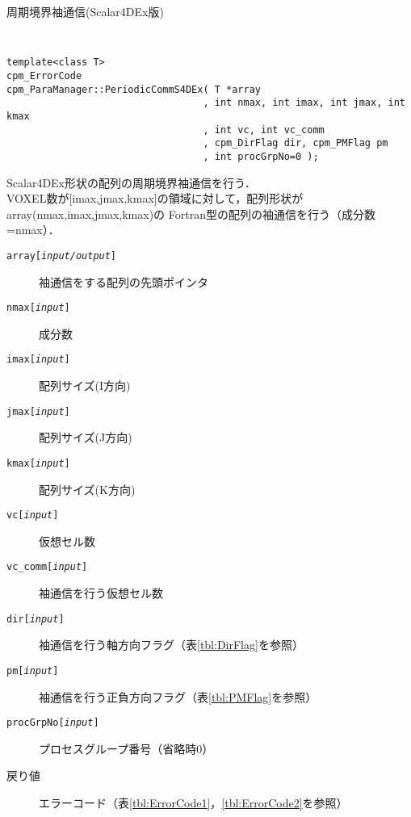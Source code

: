 \begin{spacing}{0.8}
\begin{itembox}[l]{周期境界袖通信(Scalar4DEx版)}
{\tt
\begin{verbatim}
template<class T>
cpm_ErrorCode
cpm_ParaManager::PeriodicCommS4DEx( T *array
                                  , int nmax, int imax, int jmax, int kmax
                                  , int vc, int vc_comm
                                  , cpm_DirFlag dir, cpm_PMFlag pm
                                  , int procGrpNo=0 );
\end{verbatim}
}
Scalar4DEx形状の配列の周期境界袖通信を行う．\\
VOXEL数が[imax,jmax,kmax]の領域に対して，配列形状がarray(nmax,imax,jmax,kmax)の
Fortran型の配列の袖通信を行う（成分数=nmax）．
\begin{description}
\item[{\tt array[{\it input/output}]}] 袖通信をする配列の先頭ポインタ
\item[{\tt nmax[{\it input}]}] 成分数
\item[{\tt imax[{\it input}]}] 配列サイズ(I方向)
\item[{\tt jmax[{\it input}]}] 配列サイズ(J方向)
\item[{\tt kmax[{\it input}]}] 配列サイズ(K方向)
\item[{\tt vc[{\it input}]}] 仮想セル数
\item[{\tt vc\_comm[{\it input}]}] 袖通信を行う仮想セル数
\item[{\tt dir[{\it input}]}] 袖通信を行う軸方向フラグ（表\ref{tbl:DirFlag}を参照）
\item[{\tt pm[{\it input}]}] 袖通信を行う正負方向フラグ（表\ref{tbl:PMFlag}を参照）
\item[{\tt procGrpNo[{\it input}]}] プロセスグループ番号（省略時0）
\\
\item[戻り値] エラーコード（表\ref{tbl:ErrorCode1}，\ref{tbl:ErrorCode2}を参照）
\end{description}
\end{itembox}\\
\end{spacing}
